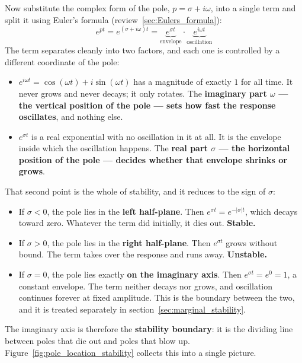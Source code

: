 \documentclass[12pt,letter]{article}
\begin{document}
Now substitute the complex form of the pole, $p = \sigma + i \omega$, into a single term and split it using Euler's formula (review~\ref{sec:Eulers_formula}):
\begin{equation}
	e^{pt} = e^{(\sigma + i \omega)t} = \underbrace{e^{\sigma t}}_\text{envelope} \cdot \underbrace{e^{i \omega t}}_\text{oscillation}
	\label{eq:pole_term_split}
\end{equation}
The term separates cleanly into two factors, and each one is controlled by a different coordinate of the pole:

\begin{itemize}
	\item $e^{i \omega t} = \cos(\omega t) + i \sin(\omega t)$ has a magnitude of exactly $1$ for all time. It never grows and never decays; it only rotates. The \textbf{imaginary part $\omega$ --- the vertical position of the pole --- sets how fast the response oscillates}, and nothing else.
	\item $e^{\sigma t}$ is a real exponential with no oscillation in it at all. It is the envelope inside which the oscillation happens. The \textbf{real part $\sigma$ --- the horizontal position of the pole --- decides whether that envelope shrinks or grows}.
\end{itemize}

That second point is the whole of stability, and it reduces to the sign of $\sigma$:

\begin{itemize}
	\item If $\sigma < 0$, the pole lies in the \textbf{left half-plane}. Then $e^{\sigma t} = e^{-|\sigma| t}$, which decays toward zero. Whatever the term did initially, it dies out. \textbf{Stable.}
	\item If $\sigma > 0$, the pole lies in the \textbf{right half-plane}. Then $e^{\sigma t}$ grows without bound. The term takes over the response and runs away. \textbf{Unstable.}
	\item If $\sigma = 0$, the pole lies exactly \textbf{on the imaginary axis}. Then $e^{\sigma t} = e^0 = 1$, a constant envelope. The term neither decays nor grows, and oscillation continues forever at fixed amplitude. This is the boundary between the two, and it is treated separately in section~\ref{sec:marginal_stability}.
\end{itemize}

\noindent The imaginary axis is therefore the \textbf{stability boundary}: it is the dividing line between poles that die out and poles that blow up. Figure~\ref{fig:pole_location_stability} collects this into a single picture.
\end{document}
